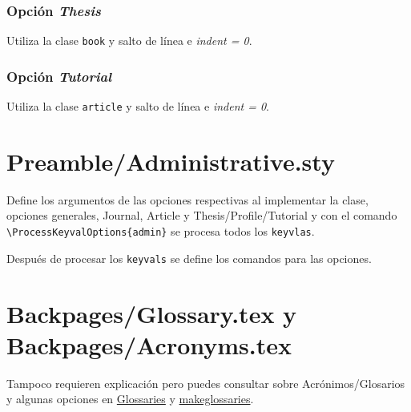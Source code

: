

\subsubsection{Opción \textit{Thesis}}
Utiliza la clase \verb|book| y salto de línea e \textit{indent = 0}. 



\subsubsection{Opción \textit{Tutorial}}
Utiliza la clase \verb|article| y salto de línea e \textit{indent = 0}. 



\section{Preamble/Administrative.sty}
Define los argumentos de las opciones respectivas al implementar la clase, opciones \textsf{generales, Journal, Article y Thesis/Profile/Tutorial} y con el comando \verb|\ProcessKeyvalOptions{admin}|  se procesa todos los \verb|keyvlas|.



Después de procesar los \verb|keyvals| se define los comandos para las opciones.



\section{Backpages/Glossary.tex y Backpages/Acronyms.tex}\label{sec:GloAcr}
Tampoco requieren explicación pero puedes consultar sobre Acrónimos/Glosarios y algunas opciones en \href{http://www.sharelatex.com/learn/Glossaries}{Glossaries} y \href{http://www.dickimaw-books.com/latex/thesis/html/makeglossaries.html}{makeglossaries}.
 
